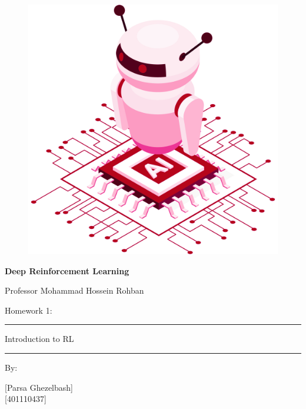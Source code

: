 \documentclass[12pt]{article}
\begin{document}
\thispagestyle{plain}

\begin{center}

\vspace*{-1.5cm}
\begin{figure}[!h]
    \centering
    \includegraphics[width=0.7\linewidth]{figs/cover-std.png}
\end{figure}

{

{\color{DarkBlue} {\fontsize{30}{50} \textbf{
Deep Reinforcement Learning
}}}

{\color{DarkBlue} {\Large
Professor Mohammad Hossein Rohban
}}
}


\vspace{20pt}

{


{\color{RedOrange}
{\Large
Homework 1:
}\\
}
{\color{BrickRed}
\rule{12cm}{0.5pt}

{\Huge
Introduction to RL
}
\rule{12cm}{0.5pt}
}

\vspace{10pt}

{\color{RoyalPurple} { \small By:} } \\
\vspace{10pt}

{\color{Blue} { \LARGE [Parsa Ghezelbash] } } \\
\vspace{5pt}
{\color{RoyalBlue} { \Large [401110437] } }


}
\end{center}
\end{document}
